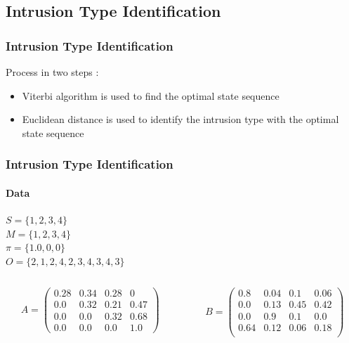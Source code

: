 \documentclass{beamer}
\begin{document}
\subsection{Intrusion Type Identification}
\begin{frame}
  \frametitle{Intrusion Type Identification}
  Process in two steps :
  \begin{itemize}
  \item Viterbi algorithm is used to find the optimal state sequence
  \item Euclidean distance is used to identify the intrusion type with the
    optimal state sequence
  \end{itemize}
\end{frame}
\begin{frame}
  \frametitle{Intrusion Type Identification}
  \framesubtitle{Data}
  $S = \{1,2,3,4\}$\\
  $M = \{1,2,3,4\}$\\
  $\pi = \{1.0,0,0\}$\\
  $O = \{2,1,2,4,2,3,4,3,4,3\}$
  \begin{columns}[T]
    \begin{column}{.45\textwidth}
      $$
      A = \begin{pmatrix}
        0.28 & 0.34 & 0.28 & 0\\
        0.0 & 0.32 & 0.21 & 0.47\\
        0.0 & 0.0 & 0.32 & 0.68\\
        0.0 & 0.0 & 0.0 & 1.0
      \end{pmatrix}
      $$
    \end{column}
    \begin{column}{.45\textwidth}
      $$
      B = \begin{pmatrix}
        0.8 & 0.04 & 0.1 & 0.06\\
        0.0 & 0.13 & 0.45 & 0.42\\
        0.0 & 0.9 & 0.1 & 0.0\\
        0.64 & 0.12 & 0.06 & 0.18\\
      \end{pmatrix}
      $$
    \end{column}
  \end{columns}
\end{frame}
\end{document}
